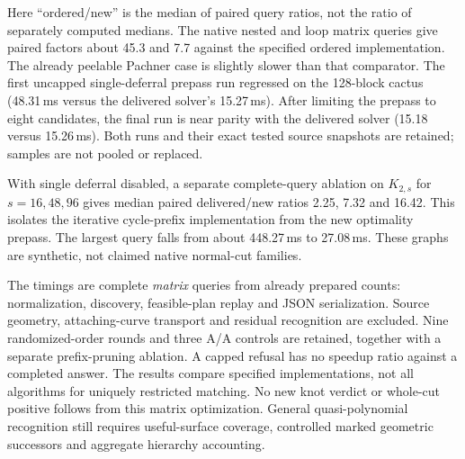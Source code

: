 

Here ``ordered/new'' is the median of paired query ratios, not the ratio
of separately computed medians.  The native nested and loop matrix queries
give paired factors about 45.3 and 7.7 against the specified ordered
implementation.  The already peelable Pachner case is slightly slower
than that comparator.  The first uncapped single-deferral prepass run
regressed on the 128-block cactus (48.31\,ms versus the delivered solver's
15.27\,ms).  After limiting the prepass to eight candidates, the final
run is near parity with the delivered solver (15.18 versus 15.26\,ms).
Both runs and their exact tested source snapshots are retained; samples
are not pooled or replaced.

With single deferral disabled, a separate complete-query ablation on
$K_{2,s}$ for $s=16,48,96$ gives median paired delivered/new ratios
2.25, 7.32 and 16.42.  This isolates the iterative cycle-prefix implementation
from the new optimality prepass.  The largest query falls from about
448.27\,ms to 27.08\,ms.  These graphs are synthetic, not claimed native
normal-cut families.

The timings are complete \emph{matrix} queries from already prepared
counts: normalization, discovery, feasible-plan replay and JSON
serialization.  Source geometry, attaching-curve transport and residual
recognition are excluded.  Nine randomized-order rounds and three A/A
controls are retained, together with a separate prefix-pruning ablation.
A capped refusal has no speedup ratio against a completed answer.  The
results compare specified implementations, not all algorithms for uniquely
restricted matching.  No new knot verdict or whole-cut positive follows
from this matrix optimization.  General quasi-polynomial recognition still
requires useful-surface coverage, controlled marked geometric successors
and aggregate hierarchy accounting.
